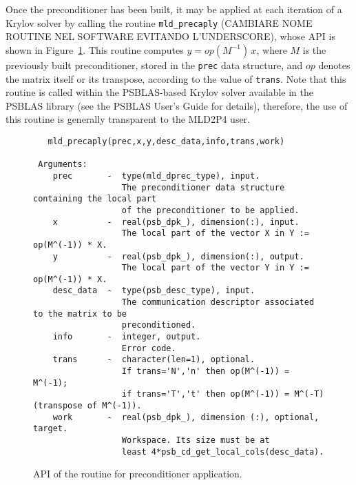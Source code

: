 Once the preconditioner has been built, it may be applied at each iteration
of a Krylov solver by calling the routine \verb|mld_precaply| (CAMBIARE NOME ROUTINE NEL SOFTWARE EVITANDO L'UNDERSCORE),
whose API is shown in Figure~\ref{fig:prcaply}.
This routine computes $y = op(M^{-1})\, x$, where $M$ is the previously built
preconditioner, stored in the \verb|prec| data structure, and $op$
denotes the matrix itself or its transpose, according to the value of \verb|trans|.
Note that this routine is called within the PSBLAS-based Krylov solver available in the PSBLAS library (see the PSBLAS User's Guide for details), 
therefore, the use of this routine is generally transparent to the MLD2P4 user.
%
\begin{figure}[h]
\begin{center}
{\small
\begin{verbatim} 
   mld_precaply(prec,x,y,desc_data,info,trans,work)

 Arguments:
    prec       -  type(mld_dprec_type), input.
                  The preconditioner data structure containing the local part
                  of the preconditioner to be applied.
    x          -  real(psb_dpk_), dimension(:), input.
                  The local part of the vector X in Y := op(M^(-1)) * X.
    y          -  real(psb_dpk_), dimension(:), output.
                  The local part of the vector Y in Y := op(M^(-1)) * X.
    desc_data  -  type(psb_desc_type), input.
                  The communication descriptor associated to the matrix to be
                  preconditioned.
    info       -  integer, output.
                  Error code.
    trans      -  character(len=1), optional.
                  If trans='N','n' then op(M^(-1)) = M^(-1);
                  if trans='T','t' then op(M^(-1)) = M^(-T) (transpose of M^(-1)).
    work       -  real(psb_dpk_), dimension (:), optional, target.
                  Workspace. Its size must be at
                  least 4*psb_cd_get_local_cols(desc_data).
\end{verbatim}
}
\end{center}
\caption{API of the routine for preconditioner application.\label{fig:prcaply}}
\end{figure}

